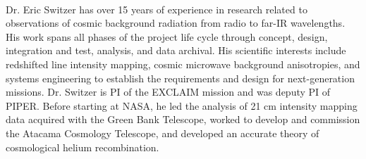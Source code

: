 \documentclass[12pt]{article}
\begin{document}
\vspace{-5mm} \small{ \\ Dr. Eric Switzer
has over 15 years of experience in research related to observations of cosmic
background radiation from radio to far-IR wavelengths. His work spans all
phases of the project life cycle through concept, design, integration and test,
analysis, and data archival. His scientific interests include redshifted line
intensity mapping, cosmic microwave background anisotropies, and systems
engineering to establish the requirements and design for next-generation
missions. Dr. Switzer is PI of the EXCLAIM mission and was deputy PI of PIPER.
Before starting at NASA, he led the analysis of 21 cm intensity mapping data
acquired with the Green Bank Telescope, worked to develop and commission the
Atacama Cosmology Telescope, and developed an accurate theory of cosmological
helium recombination.  }



\vspace{5mm}
\begin{list}{}{%
\setlength{\topsep}{0pt}%
\setlength{\leftmargin}{0.1in}%
\setlength{\listparindent}{-0.1in}%
\setlength{\itemindent}{-0.1in}%
\setlength{\parsep}{\parskip}%
}%

%
%
%
\end{list}
\end{document}
